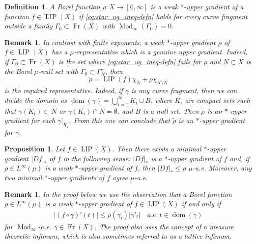 \documentclass{amsart}
\newtheorem{definition}[theorem]{Definition}
\newtheorem{proposition}[theorem]{Proposition}
\newtheorem{remark}[theorem]{Remark}
\numberwithin{equation}{section}
\newcommand{\Mod}{\operatorname{Mod}}
\newcommand{\LIP}{\operatorname{LIP}}
\newcommand{\dom}{\operatorname{dom}}
\newcommand{\Fr}{\operatorname{Fr}}
\begin{document}
\begin{definition}
A Borel function $\rho\colon X\to [0,\infty]$ is a weak $\ast$-upper gradient of a function $f\in \LIP(X)$ if \eqref{eq:star_ug_ineq-defn} holds for every curve fragment outside a family $\Gamma_0\subset \Fr(X)$ with $\Mod_\infty(\Gamma_0)=0$.
\end{definition}


\begin{remark}\label{rmk:genuine-star-ug}
	In contrast with finite exponents, a weak $\ast$-upper gradient $\rho$ of $f\in\LIP(X)$ has a $\mu$-representative which is a genuine upper gradient. Indeed, if $\Gamma_0\subset \Fr(X)$ is the set where \eqref{eq:star_ug_ineq-defn} fails for $\rho$ and $N\subset X$ is the Borel $\mu$-null set with $\Gamma_0\subset \Gamma_N^+$, then
	\[
	\tilde\rho=\LIP(f)\chi_N+\rho\chi_{X\setminus N}
	\]
	is the required representative.  Indeed, if $\gamma$ is any curve fragment, then we can divide the domain as $\dom(\gamma)=\bigcup_{i=1}^\infty K_i \cup B$, where $K_i$ are compact sets such that  $\gamma(K_i)\subset N$ or $\gamma(K_i)\cap N=\emptyset$, and $B$ is a null set. Then $\tilde{\rho}$ is an $\ast$-upper gradient for each $\gamma|_{K_i}$. From this one can conclude that $\tilde{\rho}$ is an $\ast$-upper gradient for $\gamma$.
\end{remark}

\begin{proposition}\label{prop:min-star-ug-exists}
    Let $f\in \LIP(X)$. Then there exists a minimal $\ast$-upper gradient $|Df|_\ast$ of $f$ in the following sense: $|Df|_\ast$ is a $\ast$-upper gradient of $f$ and, if $\rho\in L^\infty(\mu)$ is a weak $\ast$-upper gradient of $f$, then $|Df|_\ast\le \rho$ $\mu$-a.e. Moreover, any two minimal $\ast$-upper gradients of $f$ agree $\mu$-a.e.
\end{proposition}
\begin{remark}\label{rmk:uppergradchar}
In the proof below we use the observation that a Borel function $\rho\in L^\infty(\mu)$ is a weak $\ast$-upper gradient of $f\in \LIP(X)$ if and only if 
\begin{align*}
|(f\circ\gamma)'(t)|\le \rho(\gamma_t)|\gamma'_t|\quad a.e.\ t\in \operatorname{dom}(\gamma)
\end{align*}
for $\Mod_\infty$-a.e. $\gamma\in \Fr(X)$. The proof also uses the concept of a measure theoretic infimum, which is also sometimes referred to as a lattice infimum.
\end{remark} 
\end{document}
